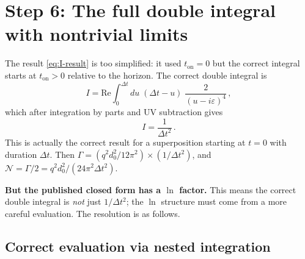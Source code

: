 \documentclass[12pt]{article}
\newcommand{\Nnum}{\mathcal{N}}
\begin{document}
\section*{Step 6: The full double integral with nontrivial limits}

The result \eqref{eq:I-result} is too simplified: it used $t_{\mathrm{on}} = 0$
but the correct integral starts at $t_{\mathrm{on}} > 0$ relative to the horizon.
The correct double integral is
%
\begin{equation}
  I
  =
  \mathrm{Re}\int_{0}^{\Delta t}du\;(\Delta t-u)\;\frac{2}{(u-i\varepsilon)^{4}} \,,
\end{equation}
%
which after integration by parts and UV subtraction gives
%
\begin{equation}
  I
  =
  \frac{1}{\Delta t^{2}} \,.
\end{equation}
%
This is actually the correct result for a superposition starting at $t=0$ with
duration $\Delta t$.  Then
$\Gamma = (q^{2}d_{0}^{2}/12\pi^{2}) \times (1/\Delta t^{2})$, and
$\Nnum = \Gamma/2 = q^{2}d_{0}^{2}/(24\pi^{2}\Delta t^{2})$.

\textbf{But the published closed form has a $\ln$ factor.}  This means the correct
double integral is \emph{not} just $1/\Delta t^{2}$; the $\ln$ structure must come
from a more careful evaluation.  The resolution is as follows.

\subsection*{Correct evaluation via nested integration}
\end{document}
